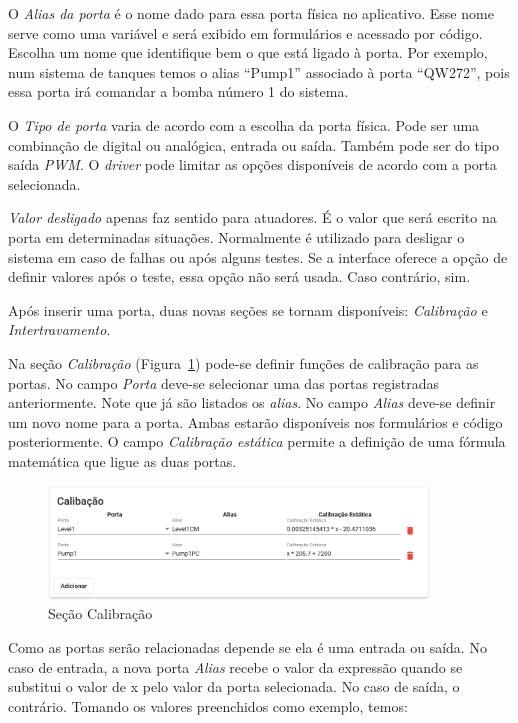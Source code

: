 O \textit{Alias da porta} é o nome dado para essa porta física no aplicativo.
Esse nome serve como uma variável e será exibido em formulários e acessado por
código. Escolha um nome que identifique bem o que está ligado à porta. Por
exemplo, num sistema de tanques temos o alias \enquote{Pump1} associado à porta
\enquote{QW272}, pois essa porta irá comandar a bomba número 1 do sistema.

O \textit{Tipo de porta} varia de acordo com a escolha da porta física. Pode ser
uma combinação de digital ou analógica, entrada ou saída. Também pode ser do
tipo saída \textit{PWM}. O \textit{driver} pode limitar as opções disponíveis de
acordo com a porta selecionada.

\textit{Valor desligado} apenas faz sentido para atuadores. É o valor que será
escrito na porta em determinadas situações. Normalmente é utilizado para
desligar o sistema em caso de falhas ou após alguns testes. Se a interface
oferece a opção de definir valores após o teste, essa opção não será usada. Caso
contrário, sim.

Após inserir uma porta, duas novas seções se tornam disponíveis:
\textit{Calibração} e \textit{Intertravamento}.

Na seção \textit{Calibração} (Figura~\ref{fig:hardware4}) pode-se definir funções
de calibração para as portas. No campo \textit{Porta} deve-se selecionar uma das
portas registradas anteriormente. Note que já são listados os \textit{alias}. No
campo \textit{Alias} deve-se definir um novo nome para a porta. Ambas estarão
disponíveis nos formulários e código posteriormente. O campo \textit{Calibração
estática} permite a definição de uma fórmula matemática que ligue as duas
portas.

\begin{figure}[ht!]
    \centering
    \includegraphics[width=0.9\textwidth]{imgs/hardware4}
    \caption[Seção Calibração]{Seção Calibração}%
    \label{fig:hardware4}
\end{figure}

Como as portas serão relacionadas depende se ela é uma entrada ou saída. No caso
de entrada, a nova porta \textit{Alias} recebe o valor da expressão quando se
substitui o valor de x pelo valor da porta selecionada. No caso de saída, o
contrário. Tomando os valores preenchidos como exemplo, temos:

